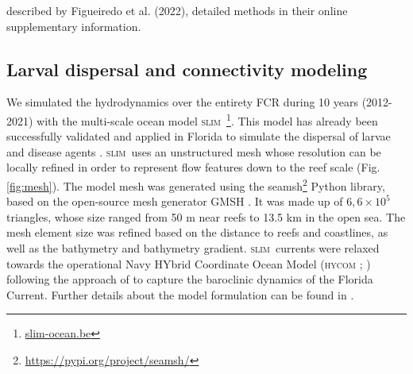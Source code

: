 \documentclass[preprint,12pt,authoryear]{elsarticle}
\newcommand{\hycom}{\textsc{hycom} }
\newcommand{\slim}{\textsc{slim}\ }
\begin{document}
described by Figueiredo et al. (2022), detailed methods in their online supplementary information.



\subsection*{Larval dispersal and connectivity modeling}

We simulated the hydrodynamics over the entirety FCR during 10 years (2012-2021) with the multi-scale ocean model \slim\footnote{\href{ https://www.slim-ocean.be}{slim-ocean.be}}. This model has already been successfully validated and applied in Florida to simulate the dispersal of larvae and disease agents \citep{frys2020fine,dobbelaere2020coupled,dobbelaere2022connecting}. \slim uses an unstructured mesh whose resolution can be locally refined in order to represent flow features down to the reef scale (Fig. \ref{fig:mesh}). The model mesh was generated using the seamsh\footnote{\href{https://pypi.org/project/seamsh/}{https://pypi.org/project/seamsh/}} Python library, based on the open-source mesh generator GMSH \citep{geuzaine2009gmsh}. It was made up of $6,6\times 10^5$ triangles, whose size ranged from 50 m near reefs to 13.5 km in the open sea. The mesh element size was refined based on the distance to reefs and coastlines, as well as the bathymetry and bathymetry gradient. \slim currents were relaxed towards the operational Navy HYbrid Coordinate Ocean Model (\hycom; \citealp{chassignet2007hycom}) following the approach of \citep{dobbelaere2022impacts} to capture the baroclinic dynamics of the Florida Current. Further details about the model formulation can be found in \citep{frys2020fine}.
\end{document}
